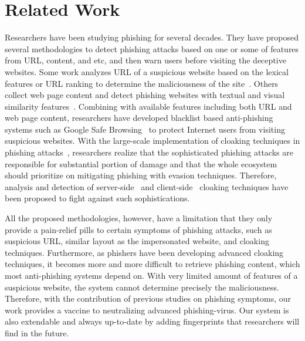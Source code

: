 \section{Related Work}

Researchers have been studying phishing for several decades.
They have proposed several methodologies to detect phishing attacks based on one or some of features from URL, content, and etc, and then warn users before visiting the deceptive websites.
Some work analyzes URL of a suspicious website based on the lexical features or URL ranking to determine the maliciousness of the site~\cite{blum2010lexical, le2011phishdef, khonji2012enhancing, feroz2015phishing}.
Others collect web page content and detect phishing websites with textual and visual similarity features~\cite{zhang2007cantina, zhang2011textual, dunlop2010goldphish}.
Combining with available features including both URL and web page content, researchers have developed blacklist based anti-phishing systems such as Google Safe Browsing~\cite{whittaker2010large} to protect Internet users from visiting suspicious websites.
With the large-scale implementation of cloaking techniques in phishing attacks~\cite{oest2020sunrise, oest2020phishtime, oest2019phishfarm, oest2018inside}, researchers realize that the sophisticated phishing attacks are responsible for substantial portion of damage and that the whole ecosystem should prioritize on mitigating phishing with evasion techniques.
Therefore, analysis and detection of server-side~\cite{wang2011cloak, invernizzi2016cloak} and client-side~\cite{zhang2021crawlphish} cloaking techniques have been proposed to fight against such sophistications.

All the proposed methodologies, however, have a limitation that they only provide a pain-relief pills to certain symptoms of phishing attacks, such as suspicious URL, similar layout as the impersonated website, and cloaking techniques.
Furthermore, as phishers have been developing advanced cloaking techniques, it becomes more and more difficult to retrieve phishing content, which most anti-phishing systems depend on.
With very limited amount of features of a suspicious website, the system cannot determine precisely the maliciousness.
Therefore, with the contribution of previous studies on phishing symptoms, our work provides a vaccine to neutralizing advanced phishing-virus.
Our system is also extendable and always up-to-date by adding fingerprints that researchers will find in the future.

